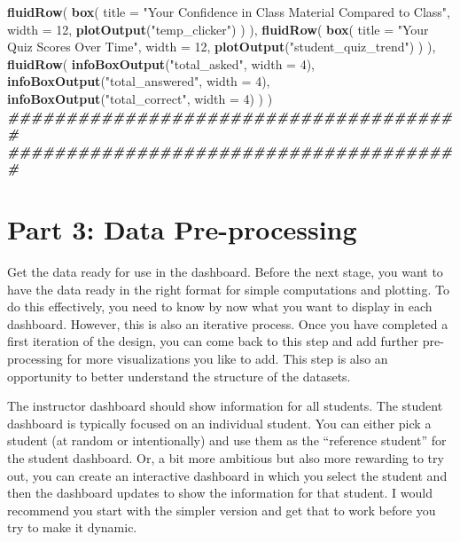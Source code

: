 \documentclass[
]{article}
\newenvironment{Shaded}{\begin{snugshade}}{\end{snugshade}}
\newcommand{\AttributeTok}[1]{\textcolor[rgb]{0.13,0.29,0.53}{#1}}
\newcommand{\DecValTok}[1]{\textcolor[rgb]{0.00,0.00,0.81}{#1}}
\newcommand{\DocumentationTok}[1]{\textcolor[rgb]{0.56,0.35,0.01}{\textbf{\textit{#1}}}}
\newcommand{\FunctionTok}[1]{\textcolor[rgb]{0.13,0.29,0.53}{\textbf{#1}}}
\newcommand{\NormalTok}[1]{#1}
\newcommand{\StringTok}[1]{\textcolor[rgb]{0.31,0.60,0.02}{#1}}
\begin{document}
\begin{Shaded}
\begin{Highlighting}[]
  \FunctionTok{fluidRow}\NormalTok{(}
    \FunctionTok{box}\NormalTok{(}
      \AttributeTok{title =} \StringTok{"Your Confidence in Class Material Compared to Class"}\NormalTok{,}
      \AttributeTok{width =} \DecValTok{12}\NormalTok{,}
      \FunctionTok{plotOutput}\NormalTok{(}\StringTok{"temp\_clicker"}\NormalTok{)}
\NormalTok{    )}
\NormalTok{  ), }
  \FunctionTok{fluidRow}\NormalTok{(}
    \FunctionTok{box}\NormalTok{(}
      \AttributeTok{title =} \StringTok{"Your Quiz Scores Over Time"}\NormalTok{,}
      \AttributeTok{width =} \DecValTok{12}\NormalTok{,}
      \FunctionTok{plotOutput}\NormalTok{(}\StringTok{"student\_quiz\_trend"}\NormalTok{)}
\NormalTok{    )}
\NormalTok{  ),}
    \FunctionTok{fluidRow}\NormalTok{(}
      \FunctionTok{infoBoxOutput}\NormalTok{(}\StringTok{"total\_asked"}\NormalTok{, }\AttributeTok{width =} \DecValTok{4}\NormalTok{),}
      \FunctionTok{infoBoxOutput}\NormalTok{(}\StringTok{"total\_answered"}\NormalTok{, }\AttributeTok{width =} \DecValTok{4}\NormalTok{),}
      \FunctionTok{infoBoxOutput}\NormalTok{(}\StringTok{"total\_correct"}\NormalTok{, }\AttributeTok{width =} \DecValTok{4}\NormalTok{)}
\NormalTok{  )}
\NormalTok{)}
\DocumentationTok{\#\#\#\#\#\#\#\#\#\#\#\#\#\#\#\#\#\#\#\#\#\#\#\#\#\#\#\#\#\#\#\#\#\#\#\#\#\#\#}
\DocumentationTok{\#\#\#\#\#\#\#\#\#\#\#\#\#\#\#\#\#\#\#\#\#\#\#\#\#\#\#\#\#\#\#\#\#\#\#\#\#\#\#}
\end{Highlighting}
\end{Shaded}

\section{Part 3: Data Pre-processing}\label{part-3-data-pre-processing}

Get the data ready for use in the dashboard. Before the next stage, you
want to have the data ready in the right format for simple computations
and plotting. To do this effectively, you need to know by now what you
want to display in each dashboard. However, this is also an iterative
process. Once you have completed a first iteration of the design, you
can come back to this step and add further pre-processing for more
visualizations you like to add. This step is also an opportunity to
better understand the structure of the datasets.

The instructor dashboard should show information for all students. The
student dashboard is typically focused on an individual student. You can
either pick a student (at random or intentionally) and use them as the
``reference student'' for the student dashboard. Or, a bit more
ambitious but also more rewarding to try out, you can create an
interactive dashboard in which you select the student and then the
dashboard updates to show the information for that student. I would
recommend you start with the simpler version and get that to work before
you try to make it dynamic.
\end{document}
